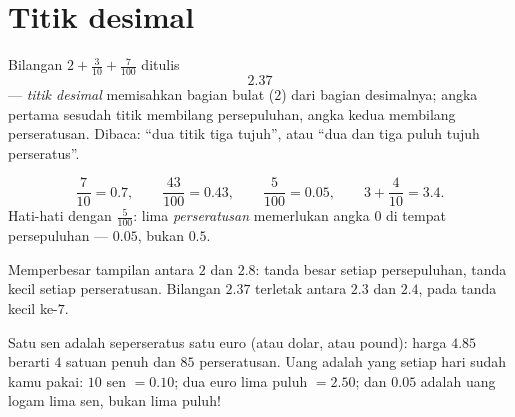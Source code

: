 \section{Titik desimal}

\begin{definition}\label{def:g4:decimals:point}
Bilangan $2 + \frac{3}{10} + \frac{7}{100}$ ditulis
\[
2.37
\]
--- \emph{titik desimal} memisahkan bagian bulat ($2$) dari
bagian desimalnya; angka pertama sesudah titik membilang
persepuluhan, angka kedua membilang perseratusan. Dibaca: ``dua
titik tiga tujuh'', atau ``dua dan tiga puluh tujuh perseratus''.
\end{definition}

\begin{example}\label{ex:g4:decimals:convert}
\[
\frac{7}{10} = 0.7, \qquad
\frac{43}{100} = 0.43, \qquad
\frac{5}{100} = 0.05, \qquad
3 + \frac{4}{10} = 3.4 .
\]
Hati-hati dengan $\frac{5}{100}$: lima \emph{perseratusan}
memerlukan angka $0$ di tempat persepuluhan --- $0.05$, bukan $0.5$.
\end{example}

\begin{omfigure}

{\small Memperbesar tampilan antara $2$ dan $2.8$: tanda besar
setiap persepuluhan, tanda kecil setiap perseratusan. Bilangan
$2.37$ terletak antara $2.3$ dan $2.4$, pada tanda kecil ke-$7$.}
\end{omfigure}

\begin{example}\label{ex:g4:decimals:money}
Satu sen adalah seperseratus satu euro (atau dolar, atau pound):
harga $4.85$ berarti $4$ satuan penuh dan $85$ perseratusan. Uang
adalah  yang setiap hari sudah kamu pakai: $10$ sen
$= 0.10$; dua euro lima puluh $= 2.50$; dan $0.05$ adalah uang logam
lima sen, bukan lima puluh!
\end{example}

